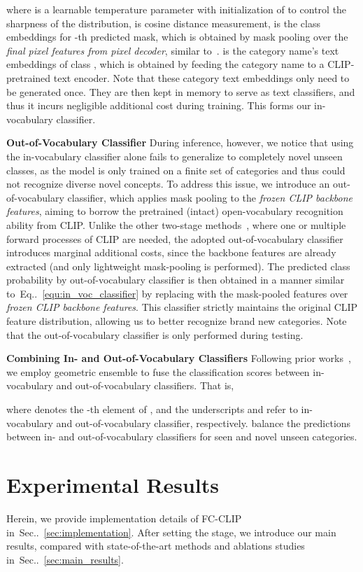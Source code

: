 \documentclass{article}
\makeatletter
\DeclareRobustCommand\onedot{\futurelet\@let@token\@onedot}
\def\@onedot{\ifx\@let@token.\else.\null\fi\xspace}
\newcommand{\equref}[1]{Eq\onedot~\eqref{#1}}
\newcommand{\secref}[1]{Sec\onedot~\ref{#1}}
\newcommand{\modelname}{FC-CLIP\xspace}
\makeatother
\begin{document}
where  is a learnable temperature parameter with initialization of  to control the sharpness of the distribution,  is cosine distance measurement,  is the class embeddings for -th predicted mask, which is obtained by mask pooling over the \textit{final pixel features from pixel decoder}, similar to~\cite{ghiasi2022scaling}.
 is the category name's text embeddings of class , which is obtained by feeding the category name to a CLIP-pretrained text encoder.
Note that these category text embeddings only need to be generated once.
They are then kept in memory to serve as text classifiers, and thus it incurs negligible additional cost during training. This forms our in-vocabulary classifier.

\noindent \textbf{Out-of-Vocabulary Classifier}\quad
During inference, however, we notice that using the in-vocabulary classifier alone fails to generalize to completely novel unseen classes, as the model is only trained on a finite set of categories and thus could not recognize diverse novel concepts.
To address this issue, we introduce an out-of-vocabulary classifier, which applies mask pooling to the \textit{frozen CLIP backbone features}, aiming to borrow the pretrained (intact) open-vocabulary recognition ability from CLIP.
Unlike the other two-stage methods~\cite{xu2021simple,liang2022open,ding2022open,xu2023open}, where one or multiple forward processes of CLIP are needed, the adopted out-of-vocabulary classifier introduces marginal additional costs, since the backbone features are already extracted (and only lightweight mask-pooling is performed).
The predicted class probability by out-of-vocabulary classifier  is then obtained in a manner similar to~\equref{equ:in_voc_classifier} by replacing  with the mask-pooled features over \textit{frozen CLIP backbone features}.
This classifier strictly maintains the original CLIP feature distribution, allowing us to better recognize brand new categories.
Note that the out-of-vocabulary classifier is only performed during testing.

\noindent \textbf{Combining In- and Out-of-Vocabulary Classifiers}\quad
Following prior works~\cite{gu2021open,ghiasi2022scaling,kuo2022f,xu2023open}, we employ geometric ensemble to fuse the classification scores between in-vocabulary and out-of-vocabulary classifiers.
That is, 

where  denotes the -th element of , and the underscripts  and  refer to in-vocabulary and out-of-vocabulary classifier, respectively.  balance the predictions between in- and out-of-vocabulary classifiers for seen and novel unseen categories. \section{Experimental Results}
\label{sec:experiments}
Herein, we provide implementation details of \modelname in~\secref{sec:implementation}.
After setting the stage, we introduce our main results, compared with state-of-the-art methods and ablations studies in~\secref{sec:main_results}.
\end{document}
